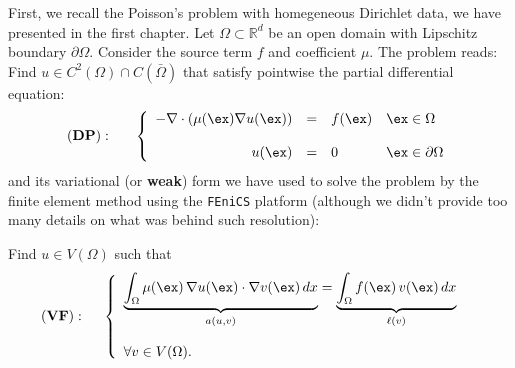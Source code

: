 First, we recall the Poisson's problem with homegeneous Dirichlet data,
we have presented in the first chapter. 
Let $\Omega \subset \mathbb{R}^d$ be an open domain with Lipschitz
boundary $\partial{\Omega}$. Consider the source term $f$ and coefficient $\mu$.
The problem reads:
Find $u \in C^2(\Omega)\cap C(\bar{\Omega})$ that satisfy pointwise
the partial differential equation:
\begin{equation}
(\mbox{\textbf{DP}}):~~~~~
\left \{
\begin{array}{rcll}
-\nabla \cdot \left ( \mu(\ex) \nabla{u}(\ex) \right) & = & f(\ex) & \ex \in \Omega \\
& & & \\
u(\ex) & = & 0 & \ex \in \partial{\Omega}
\end{array}
\right.
\end{equation}
and its variational (or \textbf{weak}) form we have used to
solve the problem by the finite element method using
the \texttt{FEniCS} platform (although we didn't provide too many
details on what was behind such resolution):
\begin{kaobox}[frametitle=Weak form of Poisson's problem]
Find $u \in V(\Omega)$ such that
\begin{equation}
(\mbox{\textbf{VF}}):~~~~ \left \{
\begin{array}{ll}
\underbrace{\int_{\Omega}{\mu(\ex)\,\nabla{u}(\ex)\cdot \nabla{v}(\ex)}\,dx}_{a(u,v)} =
        \underbrace{\int_{\Omega}{f(\ex)\,v(\ex)}\,dx}_{\ell(v)} \labeq{poissonbasic} & \\
        & \\
        \forall v \in V(\Omega). &
\end{array}
\right.
\end{equation}
\end{kaobox}

\medskip

